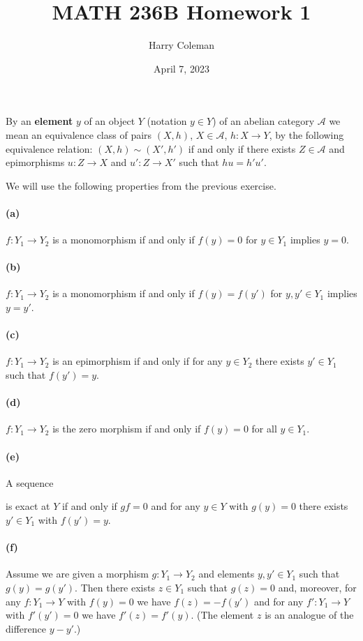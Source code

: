\documentclass[12pt]{article}
\renewcommand{\maketitle}{\thispagestyle{title}}
\newlength{\myparskip}
\newenvironment{fullbox}{\begin{lrbox}{\savefullbox}\begin{minipage}{\dimexpr\textwidth-2\fboxsep\relax}\setlength{\parskip}{\myparskip}}{\end{minipage}\end{lrbox}\framebox[\textwidth]{\usebox{\savefullbox}}}
\newenvironment{pbox}[1][]{\begin{fullbox}\def\temp{#1}\ifx\temp\empty\else\paragraph{#1}\phantom{}\fi}{\end{fullbox}}
\theoremstyle{definition}
\newcommand{\<}{\langle}
\renewcommand{\>}{\rangle}
\renewcommand{\AA}{\mathcal{A}}
\begin{document}
\title{MATH 236B Homework 1}
\author{Harry Coleman}
\date{April 7, 2023}
\maketitle

\begin{pbox}
    By an \textbf{element} $y$ of an object $Y$ (notation $y \in Y$) of an abelian category $\AA$ we mean an equivalence class of pairs $(X, h)$, $X \in \AA$, $h : X \to Y$, by the following equivalence relation: $(X, h) \sim (X', h')$ if and only if there exists $Z \in \AA$ and epimorphisms $u : Z \to X$ and $u' : Z \to X'$ such that $hu = h'u'$.
\end{pbox}

We will use the following properties from the previous exercise.

\begin{pbox}[(a)]
    $f : Y_1 \to Y_2$ is a monomorphism if and only if $f(y) = 0$ for $y \in Y_1$ implies $y = 0$.
\end{pbox}

\begin{pbox}[(b)]
    $f : Y_1 \to Y_2$ is a monomorphism if and only if $f(y) = f(y')$ for $y, y' \in Y_1$ implies $y = y'$.
\end{pbox}

\begin{pbox}[(c)]
    $f : Y_1 \to Y_2$ is an epimorphism if and only if for any $y \in Y_2$ there exists $y' \in Y_1$ such that $f(y') = y$.
\end{pbox}

\begin{pbox}[(d)]
    $f : Y_1 \to Y_2$ is the zero morphism if and only if $f(y) = 0$ for all $y \in Y_1$.
\end{pbox}

\begin{pbox}[(e)]
    A sequence  is exact at $Y$ if and only if $gf = 0$ and for any $y \in Y$ with $g(y) = 0$ there exists $y' \in Y_1$ with $f(y') = y$.
\end{pbox}

\begin{pbox}[(f)]
    Assume we are given a morphism $g : Y_1 \to Y_2$ and elements $y, y' \in Y_1$ such that $g(y) = g(y')$.
    Then there exists $z \in Y_1$ such that $g(z) = 0$ and, moreover, for any $f : Y_1 \to Y$ with $f(y) = 0$ we have $f(z) = -f(y')$ and for any $f' : Y_1 \to Y$ with $f'(y') = 0$ we have $f'(z) = f'(y)$. (The element $z$ is an analogue of the difference $y - y'$.)
\end{pbox}
\end{document}
